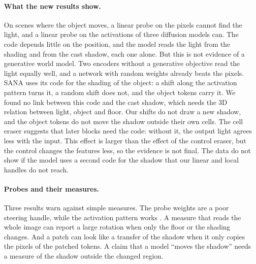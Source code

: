 \documentclass[10pt]{article}
\begin{document}
\paragraph{What the new results show.}
On scenes where the object moves, a linear probe on the pixels cannot find the light, and a linear probe on the activations of three diffusion models can.
The code depends little on the position, and the model reads the light from the shading and from the cast shadow, each one alone.
But this is not evidence of a generative world model. Two encoders without a generative objective read the light equally well, and a network with random weights already beats the pixels.
SANA uses its code for the shading of the object: a shift along the activation pattern turns it, a random shift does not, and the object tokens carry it.
We found no link between this code and the cast shadow, which needs the 3D relation between light, object and floor.
Our shifts do not draw a new shadow, and the object tokens do not move the shadow outside their own cells.
The cell eraser suggests that later blocks need the code: without it, the output light agrees less with the input. This effect is larger than the effect of the control eraser, but the control changes the features less, so the evidence is not final.
The data do not show if the model uses a second code for the shadow that our linear and local handles do not reach.

\paragraph{Probes and their measures.}
Three results warn against simple measures.
The probe weights are a poor steering handle, while the activation pattern works \citep{haufe2014interpretation}.
A measure that reads the whole image can report a large rotation when only the floor or the shading changes.
And a patch can look like a transfer of the shadow when it only copies the pixels of the patched tokens.
A claim that a model ``moves the shadow'' needs a measure of the shadow outside the changed region.
\end{document}
